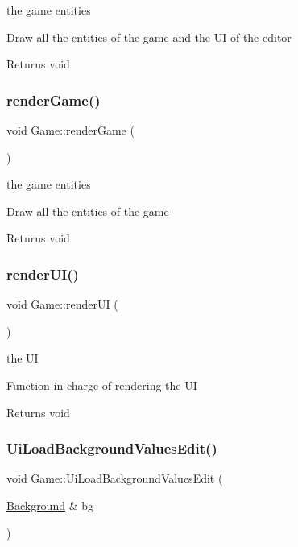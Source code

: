 the game entities

Draw all the entities of the game and the UI of the editor

\begin{DoxyReturn}{Returns}
void 
\end{DoxyReturn}
\mbox{\label{class_game_a4573580347746dbb7dbe568383682ed3}} 
\subsubsection{\texorpdfstring{render\+Game()}{renderGame()}}
{\footnotesize\ttfamily void Game\+::render\+Game (\begin{DoxyParamCaption}{ }\end{DoxyParamCaption})}

the game entities

Draw all the entities of the game

\begin{DoxyReturn}{Returns}
void 
\end{DoxyReturn}
\mbox{\label{class_game_a828811993f0d93a72758b05c98609540}} 
\subsubsection{\texorpdfstring{render\+U\+I()}{renderUI()}}
{\footnotesize\ttfamily void Game\+::render\+UI (\begin{DoxyParamCaption}{ }\end{DoxyParamCaption})}

the UI

Function in charge of rendering the UI

\begin{DoxyReturn}{Returns}
void 
\end{DoxyReturn}
\mbox{\label{class_game_a65b1b506f6c9ffb4006e94680e05cd04}} 
\subsubsection{\texorpdfstring{Ui\+Load\+Background\+Values\+Edit()}{UiLoadBackgroundValuesEdit()}}
{\footnotesize\ttfamily void Game\+::\+Ui\+Load\+Background\+Values\+Edit (\begin{DoxyParamCaption}\item[{\hyperlink{class_background}{Background} \&}]{bg }\end{DoxyParamCaption})}

